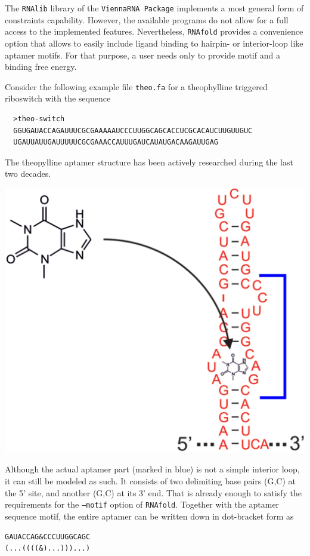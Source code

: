 \documentclass[a4paper]{article}
\begin{document}
The \texttt{RNAlib} library of the \texttt{ViennaRNA Package} implements a most general
form of constraints capability. However, the available programs do not allow for a full
access to the implemented features. Nevertheless, \texttt{RNAfold} provides a convenience
option that allows to easily include ligand binding to hairpin- or interior-loop like aptamer
motifs. For that purpose, a user needs only to provide motif and a binding free energy.

Consider the following example file \texttt{theo.fa} for a theophylline triggered
riboswitch with the sequence
\begin{verbatim}
  >theo-switch
  GGUGAUACCAGAUUUCGCGAAAAAUCCCUUGGCAGCACCUCGCACAUCUUGUUGUC
  UGAUUAUUGAUUUUUCGCGAAACCAUUUGAUCAUAUGACAAGAUUGAG
\end{verbatim}

The theopylline aptamer structure has been actively researched during the last two decades.
\begin{center}
\includegraphics[width=.75\textwidth]{Figures/theo_aptamer.eps}\\
\end{center}
Although the actual aptamer part (marked in blue) is not a simple interior loop, it
can still be modeled as such. It consists of two delimiting base pairs (G,C) at the
5' site, and another (G,C) at its 3' end. That is already enough to satisfy the requirements
for the \texttt{--motif} option of \texttt{RNAfold}. Together with the aptamer sequence
motif, the entire aptamer can be written down in dot-bracket form as

\begin{verbatim}
GAUACCAG&CCCUUGGCAGC
(...((((&)...)))...)
\end{verbatim}
\end{document}
